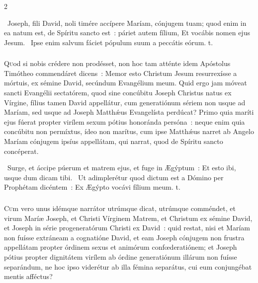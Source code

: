 \documentclass[9pt,twoside]{extarticle}
\begin{document}
\begin{multicols}{2}
{{{\begin{tightlist}{}
\item {}~Joseph, fili David, noli timére accípere Maríam, cónjugem tuam; quod enim in ea natum est, de Spíritu sancto est~: páriet autem fílium, \textred{*} Et vocábis nomen ejus Jesum. ~Ipse enim salvum fáciet pópulum suum a peccátis eórum. t.
\end{tightlist}

\subsubsection*{\center {}}
\lettrine{Q}uod si nobis crédere non prodésset, non hoc tam atténte idem Apóstolus Timótheo commendáret dicens~: Memor esto Christum Jesum resurrexísse a mórtuis, ex sémine David, secúndum Evangélium meum. Quid ergo jam móveat sancti Evangélii sectatórem, quod sine concúbitu Joseph Christus natus ex Vírgine, fílius tamen David appellátur, cum generatiónum sériem non usque ad Maríam, sed usque ad Joseph Matthǽus Evangelísta perdúcat? Primo quia maríti ejus fúerat propter virílem sexum pótius honoránda persóna~: neque enim quia concúbitu non permíxtus, ídeo non marítus, cum ipse Matthǽus narret ab Angelo Maríam cónjugem ipsíus appellátam, qui narrat, quod de Spíritu sancto concéperat.

\begin{tightlist}{}
\item {}~Surge, et áccipe púerum et matrem ejus, et fuge in Ægýptum~: \textred{*} Et esto ibi, usque dum dicam tibi. ~Ut adimplerétur quod dictum est a Dómino per Prophétam dicéntem~: Ex Ægýpto vocávi fílium meum. t.
\end{tightlist}

\subsubsection*{\center {}}
\lettrine{C}um vero unus idémque narrátor utrúmque dicat, utrúmque comméndet, et virum Maríæ Joseph, et Christi Vírginem Matrem, et Christum ex sémine David, et Joseph in série progeneratórum Christi ex David~: quid restat, nisi et Maríam non fuísse extráneam a cognatióne David, et eam Joseph cónjugem non frustra appellátam propter órdinem sexus et animórum confœderatiónem; et Joseph pótius propter dignitátem virílem ab órdine generatiónum illárum non fuísse separándum, ne hoc ipso viderétur ab illa fémina separátus, cui eum conjungébat mentis afféctus?

}}}
\end{multicols}
\end{document}
